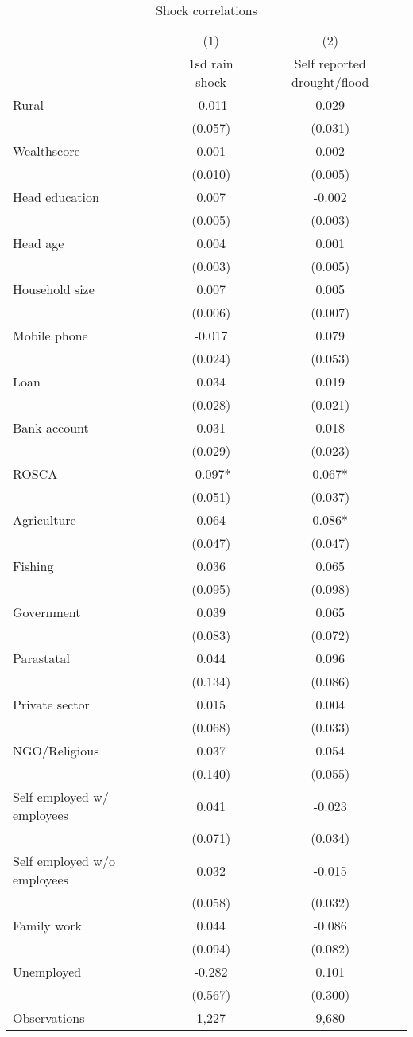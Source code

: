 \begin{table}
\centering \caption{Shock correlations} \label{shock corr}
\def\arraystretch{0.7}
\begin{tabular}{lcc} \hline
 & (1) & (2) \\
 & 1sd rain shock & Self reported drought/flood \\ \hline
Rural & -0.011 & 0.029 \\
 & (0.057) & (0.031) \\
Wealthscore & 0.001 & 0.002 \\
 & (0.010) & (0.005) \\
Head education & 0.007 & -0.002 \\
 & (0.005) & (0.003) \\
Head age & 0.004 & 0.001 \\
 & (0.003) & (0.005) \\
Household size & 0.007 & 0.005 \\
 & (0.006) & (0.007) \\
Mobile phone & -0.017 & 0.079 \\
 & (0.024) & (0.053) \\
Loan  & 0.034 & 0.019 \\
 & (0.028) & (0.021) \\
Bank account & 0.031 & 0.018 \\
 & (0.029) & (0.023) \\
ROSCA  & -0.097* & 0.067* \\
 & (0.051) & (0.037) \\
Agriculture & 0.064 & 0.086* \\
 & (0.047) & (0.047) \\
Fishing & 0.036 & 0.065 \\
 & (0.095) & (0.098) \\
Government & 0.039 & 0.065 \\
 & (0.083) & (0.072) \\
Parastatal & 0.044 & 0.096 \\
 & (0.134) & (0.086) \\
Private sector & 0.015 & 0.004 \\
 & (0.068) & (0.033) \\
NGO/Religious & 0.037 & 0.054 \\
 & (0.140) & (0.055) \\
Self employed w/ employees & 0.041 & -0.023 \\
 & (0.071) & (0.034) \\
Self employed w/o employees & 0.032 & -0.015 \\
 & (0.058) & (0.032) \\
Family work& 0.044 & -0.086 \\
 & (0.094) & (0.082) \\
Unemployed & -0.282 & 0.101 \\
 & (0.567) & (0.300) \\
Observations & 1,227 & 9,680 \\


\end{tabular}
\end{table}
